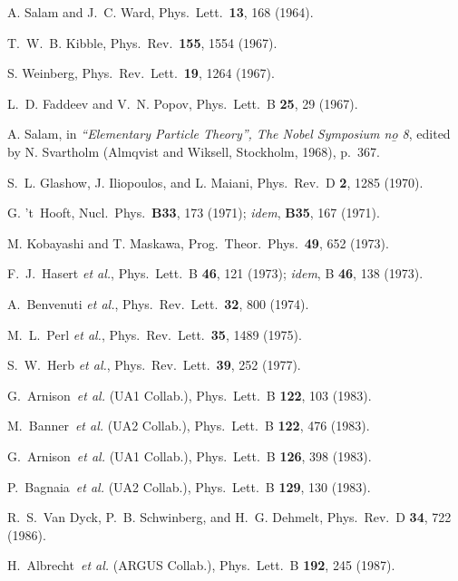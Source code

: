 \documentclass[12pt]{report}
\begin{document}
\begin{thebibliography}{100}
A. Salam and J.~C. Ward, Phys.\ Lett.\ {\bf 13},  168  (1964).

T.~W.~B. Kibble, Phys.\ Rev.\ {\bf 155},  1554  (1967).

S. Weinberg, Phys.\ Rev.\ Lett.\ {\bf 19},  1264  (1967).

L.~D. Faddeev and V.~N. Popov, Phys.\ Lett.\ B {\bf 25},  29  (1967).

A. Salam,  in {\em ``Elementary Particle Theory'', The Nobel Symposium n\b{o}
  8}, edited by N. Svartholm (Almqvist and Wiksell, Stockholm, 1968), p.\ 367.

S.~L. Glashow, J. Iliopoulos, and L. Maiani, Phys.\ Rev.\ D {\bf 2},  1285
  (1970).

G. 't~Hooft, Nucl.\ Phys.\ {\bf B33},  173  (1971); {\it idem}, {\bf B35}, 167
  (1971).

M. Kobayashi and T. Maskawa, Prog.\ Theor.\ Phys.\ {\bf 49},  652  (1973).

F.~J.~Hasert {{\it et al.}}, Phys.\ Lett.\ B {\bf 46},  121  (1973); {\it
  idem}, B {\bf 46}, 138 (1973).

A.~Benvenuti {{\it et al.}}, Phys.\ Rev.\ Lett.\ {\bf 32},  800  (1974).

M.~L.~Perl {{\it et al.}}, Phys.\ Rev.\ Lett.\ {\bf 35},  1489  (1975).

S.~W.~Herb {{\it et al.}}, Phys.\ Rev.\ Lett.\ {\bf 39},  252  (1977).

G.~Arnison~{{\it et al.}} {(UA1 Collab.)}, Phys.\ Lett.\ B {\bf 122},  103
  (1983).

M.~Banner~{{\it et al.}} {(UA2 Collab.)}, Phys.\ Lett.\ B {\bf 122},  476
  (1983).

G.~Arnison~{{\it et al.}} {(UA1 Collab.)}, Phys.\ Lett.\ B {\bf 126},  398
  (1983).

P.~Bagnaia~{{\it et al.}} {(UA2 Collab.)}, Phys.\ Lett.\ B {\bf 129},  130
  (1983).

R.~S.~Van Dyck, P.~B. Schwinberg, and H.~G. Dehmelt, Phys.\ Rev.\ D {\bf 34},
  722  (1986).

H.~Albrecht~{{\it et al.}} {(ARGUS Collab.)}, Phys.\ Lett.\ B {\bf 192},  245
  (1987).


\end{thebibliography}
\end{document}
